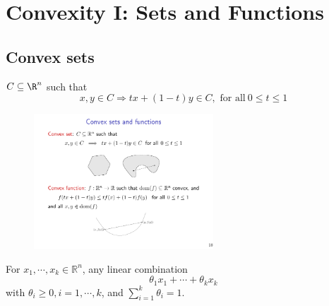 \documentclass[a4paper]{article}
\begin{document}
{%



\section{Convexity I: Sets and Functions}
\subsection{Convex sets}
\begin{defi}
  $C \subseteq \R^n$ such that 
  \[
      x, y \in C \Longrightarrow  tx + (1-t)y \in C,\text{\ for\ all}\ 0 \leq t \leq 1 
  \]
\end{defi}

\begin{figure}[htbp] 
  \centering 
  \includegraphics[width=0.6\textwidth]{img/convex_set.pdf} 
\end{figure}

\begin{defi} 
  For $x_1,\cdots,x_k \in \mathbb{R}^n$, any linear combination
  \[
    \theta_1 x_1 + \cdots + \theta_k x_k
    \]
  with $\theta_i \geq 0, i=1,\cdots, k$, and $\sum_{i = 1}^{k}\theta_i = 1$. 
\end{defi}

}
\end{document}
